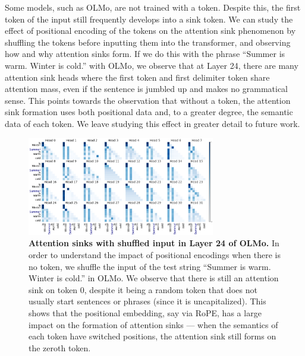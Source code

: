 Some models, such as OLMo, are not trained with a \bos{} token. Despite this, the first token of the input still frequently develops into a sink token. We can study the effect of positional encoding of the tokens on the attention sink phenomenon by shuffling the tokens before inputting them into the transformer, and observing how and why attention sinks form. If we do this with the phrase ``Summer is warm. Winter is cold.'' with OLMo, we observe that at Layer 24, there are many attention sink heads where the first token and first delimiter token share attention mass, even if the sentence is jumbled up and makes no grammatical sense. This points towards the observation that without a \bos{} token, the attention sink formation uses both positional data and, to a greater degree, the semantic data of each token. We leave studying this effect in greater detail to future work.

\begin{figure}[h]
    \centering
    \includegraphics[width=0.73\textwidth]{Figures/bos_study/attn_heads_shuffled.png}
    \caption{\small \textbf{Attention sinks with shuffled input in Layer 24 of OLMo.} In order to understand the impact of positional encodings when there is no \bos{} token, we shuffle the input of the test string ``Summer is warm. Winter is cold.'' in OLMo. We observe that there is still an attention sink on token \(0\), despite it being a random token that does not usually start sentences or phrases (since it is uncapitalized). This shows that the positional embedding, say via RoPE, has a large impact on the formation of attention sinks --- when the semantics of each token have switched positions, the attention sink still forms on the zeroth token.}
    \label{fig:bos_shuffle}
\end{figure}





